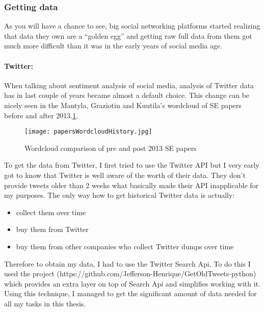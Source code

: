 \subsubsection{Getting data}
As you will have a chance to see, big social networking platforms started realizing that data they own are a “golden egg” and getting raw full data from them got much more difficult than it was in the early years of social media age.

\paragraph{Twitter:}
When talking about sentiment analysis of social media, analysis of Twitter data has in last couple of years became almost a default choice. This change can be nicely seen in the Mantyla, Graziotin and Kuutila's \cite{mantyla2018evolution} wordcloud of SE papers before and after 2013.\ref{fig:papersWordcloudHistory}.

\begin{figure}[H]%
    \centering
	\texttt{[image: papersWordcloudHistory.jpg]}
    \caption{Wordcloud comparison of pre and post 2013 SE papers}%
    \label{fig:papersWordcloudHistory}%
\end{figure}

To get the data from Twitter,  I first tried to use the Twitter API but I very early got to know that Twitter is well aware of the worth of their data. They don't provide tweets older than 2 weeks what basically made their API inapplicable for my purposes. The only way how to get historical Twitter data is actually:

\begin{itemize}
  \item collect them over time
  \item buy them from Twitter
  \item buy them from other companies who collect Twitter dumps over time
\end{itemize}

Therefore to obtain my data, I had to use the Twitter Search Api. To do this I used the project (https://github.com/Jefferson-Henrique/GetOldTweets-python) which provides an extra layer on top of Search Api and simplifies working with it. Using this technique, I managed to get the significant amount of data needed for all my tasks in this thesis.

